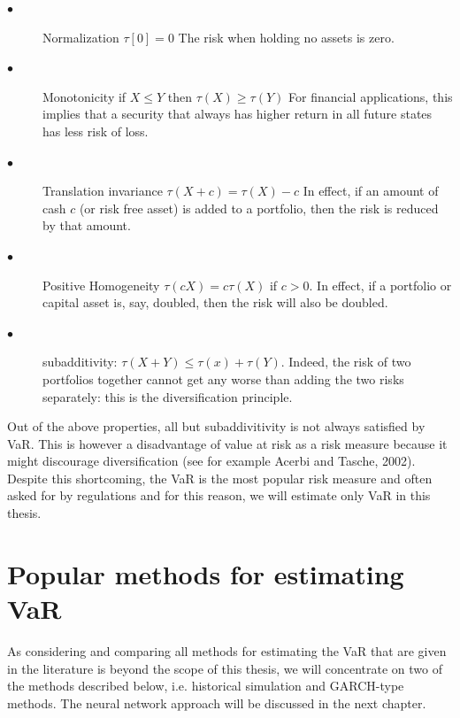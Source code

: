 \documentclass[a4paper,11pt,oneside]{book}
\begin{document}
\begin{description}
	\item[$\bullet$] Normalization \newline $\tau[0] = 0$ \newline The risk when holding no assets is zero.
	\item[$\bullet$] Monotonicity \newline if $X \leq Y$ then $\tau(X) \geq \tau(Y)$ \newline For financial applications, this implies that a
	security that always has higher return in all future states has less risk of loss.
	
	\item[$\bullet$] Translation invariance
	\newline  $\tau(X+c) = \tau(X)-c$ \newline In effect, if an amount of cash $c$ (or risk free asset)
	is added to a portfolio, then the risk is reduced by that amount.
	\item[$\bullet$] Positive Homogeneity
	\newline $\tau(cX) = c\tau(X)$ if $c>0$. \newline In effect, if a portfolio or capital asset is, say,
	doubled, then the risk will also be doubled.
	
		\item[$\bullet$] subadditivity: 
	\newline $\tau(X+Y)\leq \tau(x)+\tau(Y)$. 
	Indeed, the risk of two portfolios together cannot get any worse than adding the two risks separately: this is the diversification principle.
	
\end{description}
Out of the above properties, all but subaddivitivity is not always satisfied by VaR. This is however a disadvantage of value at risk as a risk measure because it might discourage diversification (see for example Acerbi and Tasche, 2002). Despite this shortcoming, the VaR is the most popular risk measure and often asked for by regulations and for this reason, we will estimate only VaR in this thesis.

\section{Popular methods for estimating VaR}
As considering and comparing all methods for estimating the VaR that are given in the literature is beyond the scope of this thesis, we will concentrate on two of the methods described below, i.e. historical simulation and GARCH-type methods. The neural network approach will be discussed in the next chapter.
\end{document}
